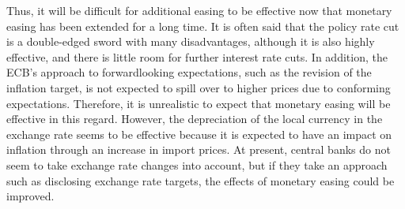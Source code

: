 \documentclass[12pt]{article}
\begin{document}
Thus, it will be difficult for additional easing to be effective now that monetary easing has been extended for a long time.
It is often said that the policy rate cut is a double-edged sword with many disadvantages, although it is also highly effective, and there is little room for further interest rate cuts.
In addition, the ECB's approach to forwardlooking expectations, such as the revision of the inflation target, is not expected to spill over to higher prices due to conforming expectations.
Therefore, it is unrealistic to expect that monetary easing will be effective in this regard.
However, the depreciation of the local currency in the exchange rate seems to be effective because it is expected to have an impact on inflation through an increase in import prices.
At present, central banks do not seem to take exchange rate changes into account, but if they take an approach such as disclosing exchange rate targets, the effects of monetary easing could be improved.

\newpage
\end{document}
